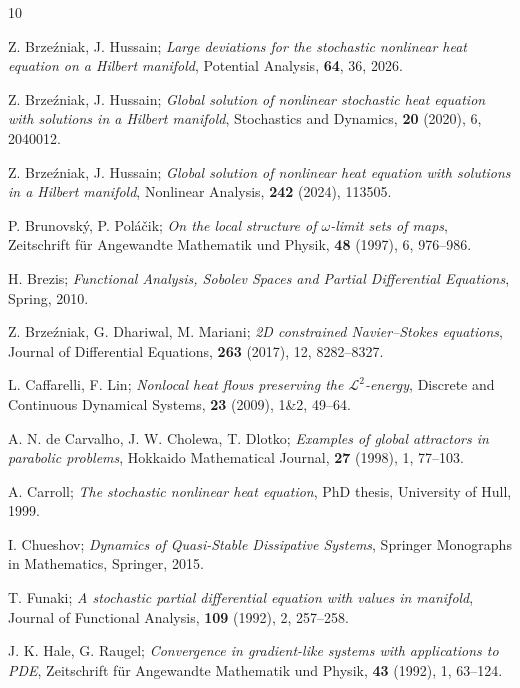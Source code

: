 \documentclass[reqno]{amsart}
\begin{document}
\begin{thebibliography}{10}

 Z. Brze\'zniak, J. Hussain;
\emph{Large deviations for the stochastic nonlinear heat equation on a Hilbert manifold},
 Potential Analysis, \textbf{64}, 36, 2026.

 Z. Brze\'zniak, J. Hussain;
\emph{Global solution of nonlinear stochastic heat equation with solutions in a Hilbert
manifold}, Stochastics and Dynamics, \textbf{20} (2020), 6, 2040012. 

 Z. Brze\'zniak, J. Hussain;
\emph{Global solution of nonlinear heat equation with solutions in a Hilbert manifold},
Nonlinear Analysis, \textbf{242}  (2024), 113505.

 P. Brunovsk\'{y}, P. Pol\'{a}\v{c}ik;
\emph{On the local structure of $\omega$-limit sets of maps}, Zeitschrift
f\"{u}r Angewandte Mathematik und Physik, \textbf{48} (1997), 6, 976--986.

 H. Brezis;
\emph{Functional Analysis, Sobolev Spaces and Partial Differential Equations},
Spring, 2010.

 Z. Brze\'{z}niak, G. Dhariwal, M. Mariani;
\emph{2D constrained Navier--Stokes equations}, Journal of Differential Equations,
\textbf{263}  (2017), 12, 8282--8327.

 L. Caffarelli, F. Lin;
\emph{Nonlocal heat flows preserving the $\mathcal{L}^{2}$-energy},
Discrete and Continuous Dynamical
Systems, \textbf{23} (2009), 1\&2, 49--64.

 A. N. de Carvalho, J. W. Cholewa, T. Dlotko;
\emph{Examples of global attractors in parabolic problems},
 Hokkaido Mathematical Journal, \textbf{27}  (1998), 1, 77--103.

 A. Carroll;
\emph{The stochastic nonlinear heat
equation}, PhD thesis, University of Hull, 1999.

 I. Chueshov;
\emph{Dynamics of Quasi-Stable Dissipative Systems},
Springer Monographs in Mathematics, Springer, 2015.

 T. Funaki;
\emph{A stochastic partial differential
equation with values in manifold},
Journal of Functional Analysis, \textbf{109} (1992), 2, 257--258.

 J. K. Hale, G. Raugel;
\emph{Convergence in gradient-like systems with applications to PDE},
Zeitschrift f\"{u}r Angewandte Mathematik und Physik, \textbf{43} (1992), 1, 63--124.


\end{thebibliography}
\end{document}
